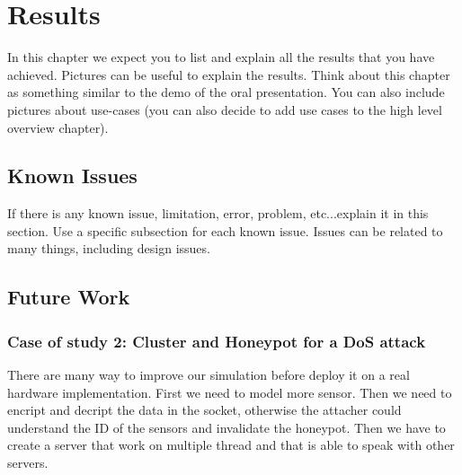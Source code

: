 \chapter{Results}
In this chapter we expect you to list and explain all the results that you have achieved. Pictures can be useful to explain the results. Think about this chapter as something similar to the demo of the oral presentation. You can also include pictures about use-cases (you can also decide to add use cases to the high level overview chapter).
\section{Known Issues}
If there is any known issue, limitation, error, problem, etc...explain it in this section. Use a specific subsection for each known issue. Issues can be related to many things, including design issues.
\section{Future Work}
\subsection{Case of study 2: Cluster and Honeypot for a DoS attack}
There are many way to improve our simulation before deploy it on a real hardware implementation. First we need to model more sensor. Then we need to encript and decript the data in the socket, otherwise the attacher could understand the ID of the sensors and invalidate the honeypot. Then we have to create a server that work on multiple thread and that is able to speak with other servers. 